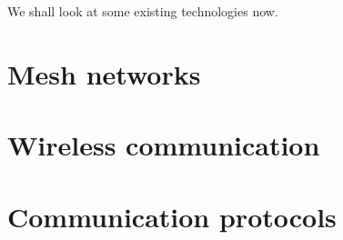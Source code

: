 We shall look at some existing technologies now.

\section{Mesh networks}

\section{Wireless communication}

\section{Communication protocols}

